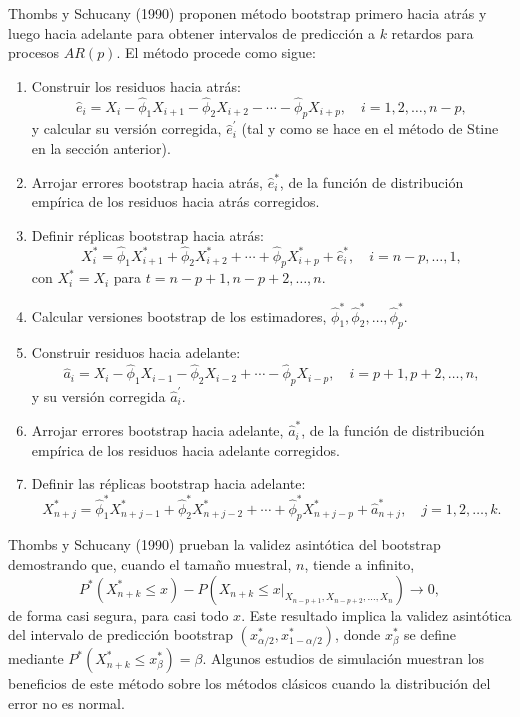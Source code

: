 \documentclass[]{book}
\theoremstyle{break}
\theoremstyle{definition}
\theoremstyle{definition}
\theoremstyle{definition}
\theoremstyle{remark}
\begin{document}
Thombs y Schucany (1990) proponen método bootstrap primero hacia atrás y
luego hacia adelante para obtener intervalos de predicción a \(k\)
retardos para procesos \(AR(p)\). El método procede como sigue:

\begin{enumerate}
\def\labelenumi{\arabic{enumi}.}
\item
  Construir los residuos hacia
  atrás:\[\widehat{e}_i=X_i-\widehat{\phi}_1X_{i+1}-\widehat{\phi}
  _2X_{i+2}-\cdots -\widehat{\phi}_{p}X_{i+p},\quad i=1,2,\ldots ,n-p,\]y
  calcular su versión corregida, \(\widehat{e}_i^{\prime}\) (tal y como
  se hace en el método de Stine en la sección anterior).
\item
  Arrojar errores bootstrap hacia atrás, \(\widehat{e}_i^{\ast}\), de la
  función de distribución empírica de los residuos hacia atrás
  corregidos.
\item
  Definir réplicas bootstrap hacia
  atrás:\[X_i^{\ast}=\widehat{\phi}_1X_{i+1}^{\ast}+\widehat{\phi}
  _2X_{i+2}^{\ast}+\cdots +\widehat{\phi}_{p}X_{i+p}^{\ast}+\widehat{e}
  _i^{\ast},\quad i=n-p,\ldots ,1,\]con \(X_i^{\ast}=X_i\) para
  \(t=n-p+1,n-p+2,\ldots ,n\).
\item
  Calcular versiones bootstrap de los estimadores,
  \(\widehat{\phi} _1^{\ast},\widehat{\phi}_2^{\ast},\ldots ,\widehat{\phi}_{p}^{\ast}\).
\item
  Construir residuos hacia
  adelante:{\[\widehat{a}_i=X_i-\widehat{\phi}_1X_{i-1}-\widehat{\phi}
  _2X_{i-2}+\cdots -\widehat{\phi}_{p}X_{i-p},\quad i=p+1,p+2,\ldots ,n,\]}
  y su versión corregida \(\widehat{a}_i^{\prime}\).
\item
  Arrojar errores bootstrap hacia adelante, \(\widehat{a}_i^{\ast}\), de
  la función de distribución empírica de los residuos hacia adelante
  corregidos.
\item
  Definir las réplicas bootstrap hacia
  adelante:{\[X_{n+j}^{\ast}=\widehat{\phi}_1^{\ast}X_{n+j-1}^{\ast}+\widehat{\phi}
  _2^{\ast}X_{n+j-2}^{\ast}+\cdots +\widehat{\phi}_{p}^{\ast
  }X_{n+j-p}^{\ast}+\widehat{a}_{n+j}^{\ast},\quad j=1,2,\ldots ,k.\]}
\end{enumerate}

Thombs y Schucany (1990) prueban la validez asintótica del bootstrap
demostrando que, cuando el tamaño muestral, \(n\), tiende a infinito,
\[P^{\ast}\left( X_{n+k}^{\ast}\leq x \right) -P\left( X_{n+k}\leq
x|_{X_{n-p+1},X_{n-p+2},\ldots ,X_n} \right) \rightarrow 0,\]de forma
casi segura, para casi todo \(x\). Este resultado implica la validez
asintótica del intervalo de predicción bootstrap
\((x_{\alpha /2}^{\ast},x_{1-\alpha /2}^{\ast})\), donde
\(x_{\beta }^{\ast}\) se define mediante
\(P^{\ast}\left( X_{n+k}^{\ast}\leq x_{\beta }^{\ast} \right) =\beta\).
Algunos estudios de simulación muestran los beneficios de este método
sobre los métodos clásicos cuando la distribución del error no es
normal.
\end{document}
